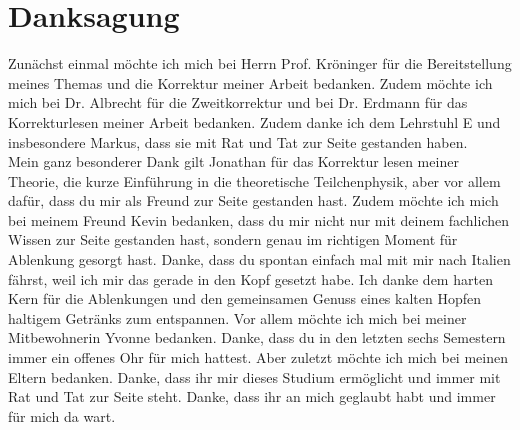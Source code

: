 \chapter{Danksagung}
Zunächst einmal möchte ich mich bei Herrn Prof. Kröninger für die Bereitstellung meines Themas und die Korrektur meiner Arbeit bedanken. Zudem möchte ich mich bei Dr. Albrecht für die Zweitkorrektur und bei Dr. Erdmann für das Korrekturlesen meiner Arbeit bedanken. Zudem danke ich dem Lehrstuhl E und insbesondere Markus, dass sie mit Rat und Tat zur Seite gestanden haben.\\
Mein ganz besonderer Dank gilt Jonathan für das Korrektur lesen meiner Theorie, die kurze Einführung in die theoretische Teilchenphysik, aber vor allem dafür, dass du mir als Freund zur Seite gestanden hast. Zudem möchte ich mich bei meinem Freund Kevin bedanken, dass du mir nicht nur mit deinem fachlichen Wissen zur Seite gestanden hast, sondern genau im richtigen Moment für Ablenkung gesorgt hast. Danke, dass du spontan einfach mal mit mir nach Italien fährst, weil ich mir das gerade in den Kopf gesetzt habe. Ich danke dem harten Kern für die Ablenkungen und den gemeinsamen Genuss eines kalten Hopfen haltigem Getränks zum entspannen. Vor allem möchte ich mich bei meiner Mitbewohnerin Yvonne bedanken. Danke, dass du in den letzten sechs Semestern immer ein offenes Ohr für mich hattest. Aber zuletzt möchte ich mich bei meinen Eltern bedanken. Danke, dass ihr mir dieses Studium ermöglicht und immer mit Rat und Tat zur Seite steht. Danke, dass ihr an mich geglaubt habt und immer für mich da wart. 
